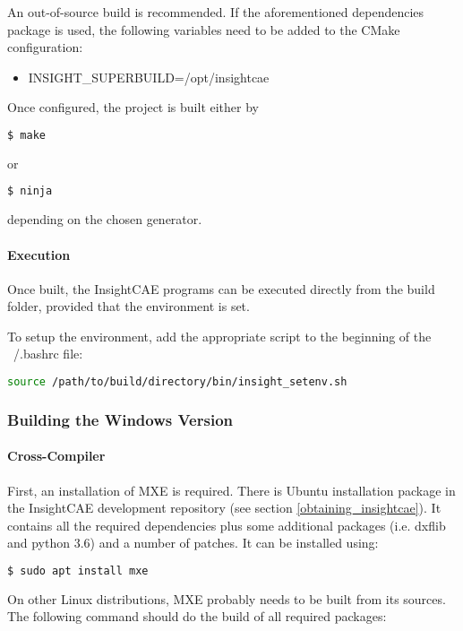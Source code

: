 An out-of-source build is recommended.
If the aforementioned dependencies package is used, the following variables need to be added to the CMake configuration:
\begin{itemize}
\item INSIGHT\_SUPERBUILD=/opt/insightcae
\end{itemize}

Once configured, the project is built either by
\begin{lstlisting}[language=bash]
$ make 
\end{lstlisting}
or
\begin{lstlisting}[language=bash]
$ ninja
\end{lstlisting}
depending on the chosen generator.

\paragraph{Execution}
Once built, the InsightCAE programs can be executed directly from the build folder, provided that the environment is set.

To setup the environment, add the appropriate script to the beginning of the ~/.bashrc file:
\begin{lstlisting}[language=bash]
source /path/to/build/directory/bin/insight_setenv.sh
\end{lstlisting}

\subsubsection{Building the Windows Version}

\paragraph{Cross-Compiler}
First, an installation of MXE is required.
There is Ubuntu installation package in the InsightCAE development repository (see section \ref{obtaining_insightcae}).
It contains all the required dependencies plus some additional packages (i.e. dxflib and python 3.6) and a number of patches. 
It can be installed using:

\begin{lstlisting}[language=bash]
$ sudo apt install mxe
\end{lstlisting}

On other Linux distributions, MXE probably needs to be built from its sources.
The following command should do the build of all required packages:

